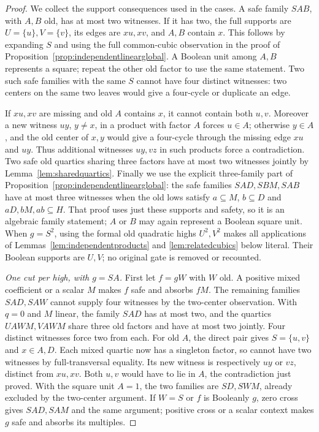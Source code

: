 \documentclass[11pt]{article}
\theoremstyle{definition}
\theoremstyle{remark}
\begin{document}
\begin{proof}
We collect the support consequences used in the cases. A safe family
$SAB$, with $A,B$ old, has at most two witnesses. If it has two, the
full supports are $U=\{u\},V=\{v\}$, its edges are $xu,xv$, and
$A,B$ contain $x$. This follows by expanding $S$ and using the full
common-cubic observation in the proof of
Proposition~\ref{prop:independentlinearglobal}. A Boolean unit among
$A,B$ represents a square; repeat the other old factor to use the same
statement. Two such safe families with the same $S$ cannot have four
distinct witnesses: two centers on the same two leaves would give a
four-cycle or duplicate an edge.

If $xu,xv$ are missing and old $A$ contains $x$, it cannot contain both
$u,v$. Moreover a new witness $uy$, $y\ne x$, in a product with factor
$A$ forces $u\in A$; otherwise $y\in A$, and the old center of $x,y$
would give a four-cycle through the missing edge $xu$ and $uy$.
Thus additional witnesses $uy,vz$ in such products force a contradiction.
Two safe old quartics sharing three factors have at most two witnesses
jointly by Lemma~\ref{lem:sharedquartics}.
Finally we use the explicit three-family part of
Proposition~\ref{prop:independentlinearglobal}: the safe families
$SAD,SBM,SAB$ have at most three witnesses when the old lows satisfy
$a\subseteq M$, $b\subseteq D$ and $aD,bM,ab\subseteq H$.
That proof uses just these supports and safety, so it is an algebraic
family statement; $A$ or $B$ may again represent a Boolean square unit.
When $g=S^2$, using the formal old quadratic highs $U^2,V^2$ makes all
applications of Lemmas~\ref{lem:independentproducts} and
\ref{lem:relatedcubics} below literal. Their Boolean supports are $U,V$;
no original gate is removed or recounted.

\emph{One cut per high, with $g=SA$.} First let $f=gW$ with $W$ old.
A positive mixed coefficient or a scalar $M$ makes $f$ safe and absorbs
$fM$. The remaining families $SAD,SAW$ cannot supply four witnesses by
the two-center observation. With $q=0$ and $M$ linear, the family $SAD$
has at most two, and the quartics $UAWM,VAWM$ share three old factors and
have at most two jointly. Four distinct witnesses force two from each.
For old $A$, the direct pair gives $S=\{u,v\}$ and $x\in A,D$.
Each mixed quartic now has a singleton factor, so cannot have two
witnesses by full-transversal equality. Its new witness is respectively
$uy$ or $vz$, distinct from $xu,xv$. Both $u,v$ would have to lie in
$A$, the contradiction just proved. With the square unit $A=1$, the two
families are $SD,SWM$, already excluded by the two-center argument.
If $W=S$ or $f$ is Booleanly $g$, zero cross gives $SAD,SAM$ and the
same argument; positive cross or a scalar context makes $g$ safe and
absorbs its multiples.


\end{proof}
\end{document}
